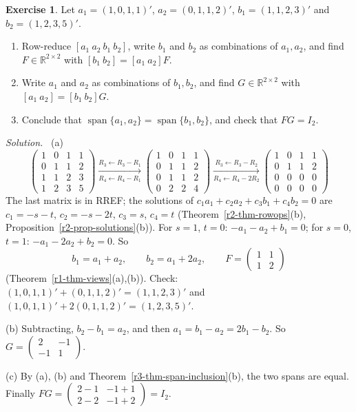 \documentclass[12pt]{article}
\newcommand{\R}{\mathbb R}
\DeclareMathOperator{\Span}{span}
\theoremstyle{definition}
\newtheorem{exercise}{Exercise}
\newenvironment{solution}{\par\noindent\textit{Solution.}\ }{\par\smallskip}
\begin{document}
\begin{exercise}\label{r3-dr-same-span}
Let \(a_1=(1,0,1,1)'\), \(a_2=(0,1,1,2)'\), \(b_1=(1,1,2,3)'\) and \(b_2=(1,2,3,5)'\).
\begin{enumerate}
\item Row-reduce \([a_1\ a_2\ b_1\ b_2]\), write \(b_1\) and \(b_2\) as combinations of \(a_1,a_2\), and
find \(F\in\R^{2\times2}\) with \([b_1\ b_2]=[a_1\ a_2]F\).
\item Write \(a_1\) and \(a_2\) as combinations of \(b_1,b_2\), and find \(G\in\R^{2\times2}\) with
\([a_1\ a_2]=[b_1\ b_2]G\).
\item Conclude that \(\Span\{a_1,a_2\}=\Span\{b_1,b_2\}\), and check that \(FG=I_2\).
\end{enumerate}
\end{exercise}
\begin{solution}
(a)
\[
\begin{pmatrix}1&0&1&1\\0&1&1&2\\1&1&2&3\\1&2&3&5\end{pmatrix}
\xrightarrow[R_4\leftarrow R_4-R_1]{R_3\leftarrow R_3-R_1}
\begin{pmatrix}1&0&1&1\\0&1&1&2\\0&1&1&2\\0&2&2&4\end{pmatrix}
\xrightarrow[R_4\leftarrow R_4-2R_2]{R_3\leftarrow R_3-R_2}
\begin{pmatrix}1&0&1&1\\0&1&1&2\\0&0&0&0\\0&0&0&0\end{pmatrix}
\]
The last matrix is in RREF; the solutions of \(c_1a_1+c_2a_2+c_3b_1+c_4b_2=0\) are \(c_1=-s-t\),
\(c_2=-s-2t\), \(c_3=s\), \(c_4=t\) (Theorem~\ref{r2-thm-rowops}(b),
Proposition~\ref{r2-prop-solutions}(b)). For \(s=1\), \(t=0\): \(-a_1-a_2+b_1=0\); for \(s=0\),
\(t=1\): \(-a_1-2a_2+b_2=0\). So
\[
b_1=a_1+a_2,\qquad b_2=a_1+2a_2,\qquad F=\begin{pmatrix}1&1\\1&2\end{pmatrix}
\]
(Theorem~\ref{r1-thm-views}(a),(b)). Check: \((1,0,1,1)'+(0,1,1,2)'=(1,1,2,3)'\) and
\((1,0,1,1)'+2(0,1,1,2)'=(1,2,3,5)'\).

(b) Subtracting, \(b_2-b_1=a_2\), and then \(a_1=b_1-a_2=2b_1-b_2\). So
\(G=\left(\begin{smallmatrix}2&-1\\-1&1\end{smallmatrix}\right)\).

(c) By (a), (b) and Theorem~\ref{r3-thm-span-inclusion}(b), the two spans are equal. Finally
\(FG=\left(\begin{smallmatrix}2-1&-1+1\\2-2&-1+2\end{smallmatrix}\right)=I_2\).
\end{solution}
\end{document}
